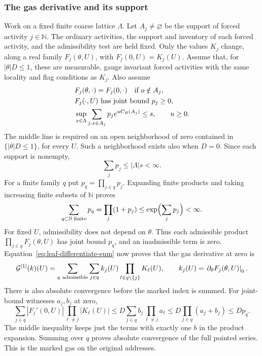 \subsubsection{The gas derivative and its support}
Work on a fixed finite coarse lattice $\Lambda$. Let $A_j\ne\varnothing$
be the support of forced activity $j\in\mathbb N$. The ordinary
activities, the support and inventory of each forced activity, and the
admissibility test are held fixed. Only the values $K_j$ change, along
a real family $F_j(\theta,U)$, with $F_j(0,U)=K_j(U)$.
Assume that, for $|\theta|D\le1$, these are measurable,
gauge invariant forced activities with the same locality and flag
conditions as $K_j$. Also assume
\begin{equation}\label{eq:leaf-season-bounds}
 \begin{split}
 &F_j(\theta,\cdot)=F_j(0,\cdot)\quad\hbox{if }o\notin A_j,\\
 &F_j(\cdot,U)\text{ has joint bound }p_j\ge0,\\
 &\sup_{x\in\Lambda}\sum_{j:x\in A_j}p_j e^{u C_B(A_j)}\le s,
                         \qquad u\ge0.
 \end{split}
\end{equation}
The middle line is required on an open neighborhood of zero contained
in $\{|\theta|D\le1\}$, for every $U$. Such a neighborhood exists
also when $D=0$. Since each support is nonempty,
\[
                  \sum_jp_j\le |\Lambda|s<\infty.
\]
For a finite family $q$ put $p_q=\prod_{j\in q}p_j$.
Expanding finite products and taking increasing finite subsets of
$\mathbb N$ proves
\[
       \sum_{\substack{q\subset\mathbb N\;\mathrm{finite}}}p_q
              =\prod_j(1+p_j)\le\exp\Bigl(\sum_jp_j\Bigr)<\infty.
\]
For fixed $U$, admissibility does not depend on $\theta$. Thus each
admissible product $\prod_{j\in q}F_j(\theta,U)$ has joint bound
$p_q$, and an inadmissible term is zero. Equation~\eqref{eq:leaf-differentiate-sum}
now proves that the gas derivative at zero is
\begin{equation}\label{eq:leaf-gas-derivative}
 \mathcal G^{[1]}(k)(U)
 =\sum_{q\ {\rm admissible}}\sum_{j\in q}
             k_j(U)\prod_{\ell\in q\setminus\{j\}}K_\ell(U),
 \qquad k_j(U)=\left.\partial_\theta F_j(\theta,U)\right|_0.
\end{equation}
There is also absolute convergence before the marked index is summed.
For joint-bound witnesses $a_j,b_j$ at zero,
\[
 \sum_{j\in q}|F_j'(0,U)|\prod_{\ell\ne j}|K_\ell(U)|
 \le D\sum_{j\in q}b_j\prod_{\ell\ne j}a_\ell
 \le D\prod_{j\in q}(a_j+b_j)\le Dp_q.
\]
The middle inequality keeps just the terms with exactly one $b$ in
the product expansion. Summing over $q$ proves absolute convergence
of the full pointed series. This is the marked gas on the original addresses.

